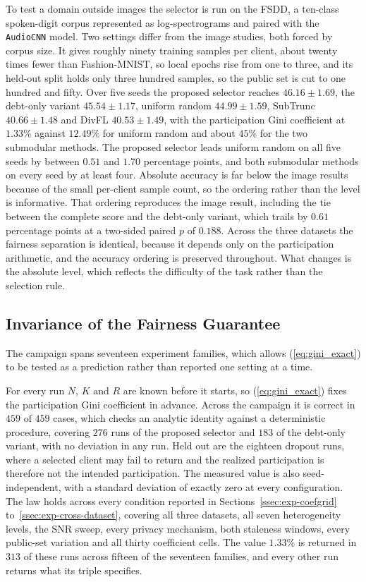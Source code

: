 \documentclass[journal]{IEEEtran}
\newcommand{\rev}[1]{{\color{blue}#1}}
\begin{document}
\rev{To test a domain outside images the selector is run on the FSDD, a ten-class spoken-digit corpus represented as log-spectrograms and paired with the \texttt{AudioCNN} model. Two settings differ from the image studies, both forced by corpus size. It gives roughly ninety training samples per client, about twenty times fewer than Fashion-MNIST, so local epochs rise from one to three, and its held-out split holds only three hundred samples, so the public set is cut to one hundred and fifty. Over five seeds the proposed selector reaches $46.16 \pm 1.69$, the debt-only variant $45.54 \pm 1.17$, uniform random $44.99 \pm 1.59$, SubTrunc $40.66 \pm 1.48$ and DivFL $40.53 \pm 1.49$, with the participation Gini coefficient at $1.33\%$ against $12.49\%$ for uniform random and about $45\%$ for the two submodular methods. The proposed selector leads uniform random on all five seeds by between $0.51$ and $1.70$ percentage points, and both submodular methods on every seed by at least four. Absolute accuracy is far below the image results because of the small per-client sample count, so the ordering rather than the level is informative. That ordering reproduces the image result, including the tie between the complete score and the debt-only variant, which trails by $0.61$ percentage points at a two-sided paired $p$ of $0.188$. Across the three datasets the fairness separation is identical, because it depends only on the participation arithmetic, and the accuracy ordering is preserved throughout. What changes is the absolute level, which reflects the difficulty of the task rather than the selection rule.}

\subsection{Invariance of the Fairness Guarantee}
\label{ssec:exp-invariance}

\rev{The campaign spans seventeen experiment families, which allows (\ref{eq:gini_exact}) to be tested as a prediction rather than reported one setting at a time.}

\rev{For every run $N$, $K$ and $R$ are known before it starts, so (\ref{eq:gini_exact}) fixes the participation Gini coefficient in advance. Across the campaign it is correct in $459$ of $459$ cases, which checks an analytic identity against a deterministic procedure, covering $276$ runs of the proposed selector and $183$ of the debt-only variant, with no deviation in any run. Held out are the eighteen dropout runs, where a selected client may fail to return and the realized participation is therefore not the intended participation. The measured value is also seed-independent, with a standard deviation of exactly zero at every configuration. The law holds across every condition reported in Sections~\ref{ssec:exp-coefgrid} to~\ref{ssec:exp-cross-dataset}, covering all three datasets, all seven heterogeneity levels, the SNR sweep, every privacy mechanism, both staleness windows, every public-set variation and all thirty coefficient cells. The value $1.33\%$ is returned in $313$ of these runs across fifteen of the seventeen families, and every other run returns what its triple specifies.}
\end{document}
